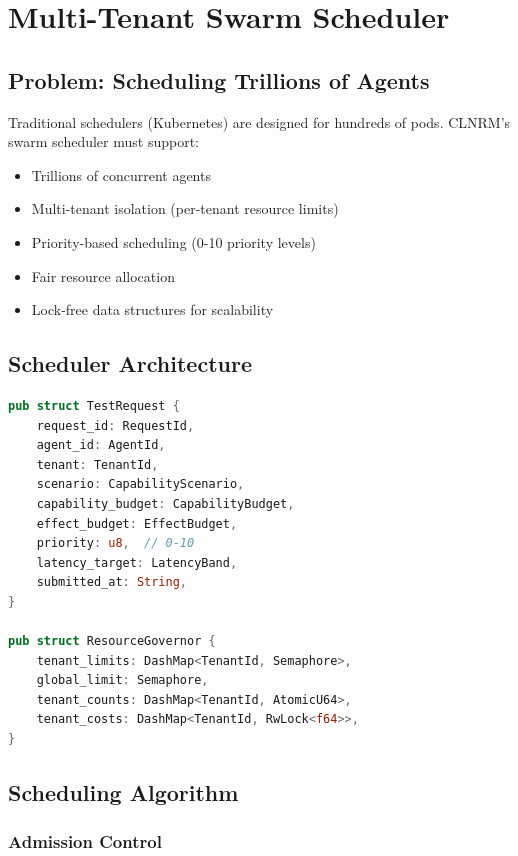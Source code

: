 \documentclass[12pt,twoside,openright]{book}
\theoremstyle{plain}
\theoremstyle{definition}
\theoremstyle{remark}
\begin{document}
\chapter{Multi-Tenant Swarm Scheduler}

\section{Problem: Scheduling Trillions of Agents}

Traditional schedulers (Kubernetes) are designed for hundreds of pods. CLNRM's swarm scheduler must support:

\begin{itemize}
  \item Trillions of concurrent agents
  \item Multi-tenant isolation (per-tenant resource limits)
  \item Priority-based scheduling (0-10 priority levels)
  \item Fair resource allocation
  \item Lock-free data structures for scalability
\end{itemize}

\section{Scheduler Architecture}

\begin{lstlisting}[language=Rust, caption=SwarmScheduler Data Structures]
pub struct TestRequest {
    request_id: RequestId,
    agent_id: AgentId,
    tenant: TenantId,
    scenario: CapabilityScenario,
    capability_budget: CapabilityBudget,
    effect_budget: EffectBudget,
    priority: u8,  // 0-10
    latency_target: LatencyBand,
    submitted_at: String,
}

pub struct ResourceGovernor {
    tenant_limits: DashMap<TenantId, Semaphore>,
    global_limit: Semaphore,
    tenant_counts: DashMap<TenantId, AtomicU64>,
    tenant_costs: DashMap<TenantId, RwLock<f64>>,
}
\end{lstlisting}

\section{Scheduling Algorithm}

\subsection{Admission Control}
\end{document}
